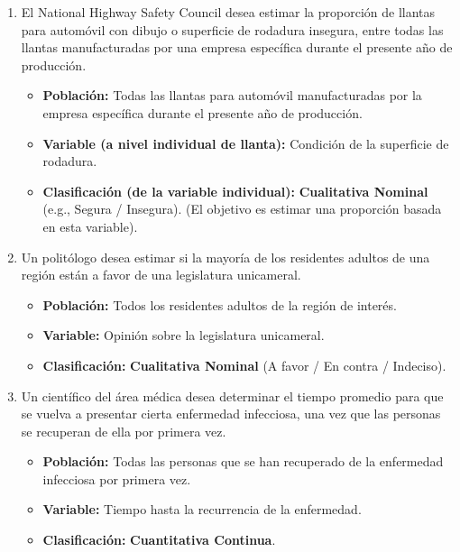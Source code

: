 \documentclass[12pt, letterpaper]{article}
\begin{document}
\begin{enumerate}
    \item El National Highway Safety Council desea estimar la proporción de llantas para automóvil con dibujo o superficie de rodadura insegura, entre todas las llantas manufacturadas por una empresa específica durante el presente año de producción.
        \begin{itemize}
            \item \textbf{Población:} Todas las llantas para automóvil manufacturadas por la empresa específica durante el presente año de producción.
            \item \textbf{Variable (a nivel individual de llanta):} Condición de la superficie de rodadura.
            \item \textbf{Clasificación (de la variable individual):} \textbf{Cualitativa Nominal} (e.g., Segura / Insegura). (El objetivo es estimar una proporción basada en esta variable).
        \end{itemize}

    \item Un politólogo desea estimar si la mayoría de los residentes adultos de una región están a favor de una legislatura unicameral.
        \begin{itemize}
            \item \textbf{Población:} Todos los residentes adultos de la región de interés.
            \item \textbf{Variable:} Opinión sobre la legislatura unicameral.
            \item \textbf{Clasificación:} \textbf{Cualitativa Nominal} (A favor / En contra / Indeciso).
        \end{itemize}

    \item Un científico del área médica desea determinar el tiempo promedio para que se vuelva a presentar cierta enfermedad infecciosa, una vez que las personas se recuperan de ella por primera vez.
        \begin{itemize}
            \item \textbf{Población:} Todas las personas que se han recuperado de la enfermedad infecciosa por primera vez.
            \item \textbf{Variable:} Tiempo hasta la recurrencia de la enfermedad.
            \item \textbf{Clasificación:} \textbf{Cuantitativa Continua}.
        \end{itemize}


\end{enumerate}
\end{document}
